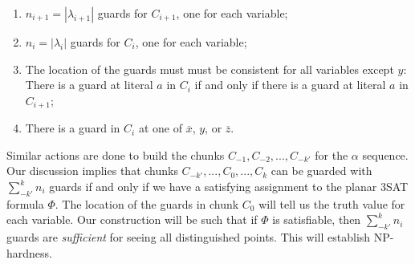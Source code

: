 \documentclass[11pt]{article}
\begin{document}
\begin{enumerate}
 \item $n_{i+1} = |\lambda_{i+1}|$ guards for $C_{i+1}$, one for each variable;
 \item $n_i = |\lambda_i|$ guards for $C_i$, one for each variable;
 \item The location of the guards must must be consistent for all variables except $y$: There is a guard at literal $a$ in $C_i$ if and only if there is a guard at literal $a$ in $C_{i+1}$;
 \item There is a guard in $C_i$ at one of $\overline{x}$, $y$, or $\overline{z}$.
\end{enumerate}

Similar actions are done to build the chunks $C_{-1}, C_{-2}, ..., C_{-k'}$ for the $\alpha$ sequence.  Our discussion implies that chunks $C_{-k'}, ..., C_0, ..., C_k$ can be guarded with $\sum_{-k'}^k n_i$ guards if and only if we have a satisfying assignment to the planar 3SAT formula $\Phi$.  The location of the guards in chunk $C_0$ will tell us the truth value for each variable.  Our construction will be such that if $\Phi$ is satisfiable, then $\sum_{-k'}^k n_i$ guards are {\em sufficient} for seeing all distinguished points.  This will establish NP-hardness.
\end{document}
